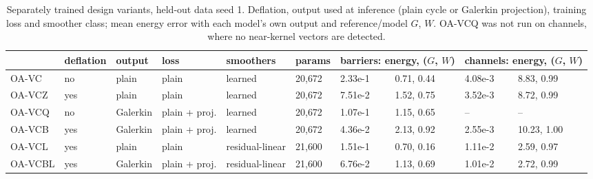 \begin{table}[tbp]\centering\footnotesize\setlength{\tabcolsep}{4pt}
\caption{Separately trained design variants, held-out data seed 1. Deflation, output used at inference (plain cycle or Galerkin projection), training loss and smoother class; mean energy error with each model's own output and reference/model $G$, $W$. OA-VCQ was not run on channels, where no near-kernel vectors are detected.}\label{tab:factorial}
\begin{adjustbox}{max width=\linewidth}
\begin{tabular}{llllllllll}\toprule
 & deflation & output & loss & smoothers & params & \multicolumn{2}{c}{barriers: energy, ($G$, $W$)} & \multicolumn{2}{c}{channels: energy, ($G$, $W$)} \\\midrule
OA-VC & no & plain & plain & learned & 20{,}672 & 2.33e-1 & 0.71, 0.44 & 4.08e-3 & 8.83, 0.99 \\
OA-VCZ & yes & plain & plain & learned & 20{,}672 & 7.51e-2 & 1.52, 0.75 & 3.52e-3 & 8.72, 0.99 \\
OA-VCQ & no & Galerkin & plain + proj. & learned & 20{,}672 & 1.07e-1 & 1.15, 0.65 & -- & -- \\
OA-VCB & yes & Galerkin & plain + proj. & learned & 20{,}672 & 4.36e-2 & 2.13, 0.92 & 2.55e-3 & 10.23, 1.00 \\
OA-VCL & yes & plain & plain & residual-linear & 21{,}600 & 1.51e-1 & 0.70, 0.16 & 1.11e-2 & 2.59, 0.97 \\
OA-VCBL & yes & Galerkin & plain + proj. & residual-linear & 21{,}600 & 6.76e-2 & 1.13, 0.69 & 1.01e-2 & 2.72, 0.99 \\
\bottomrule\end{tabular}
\end{adjustbox}
\end{table}
